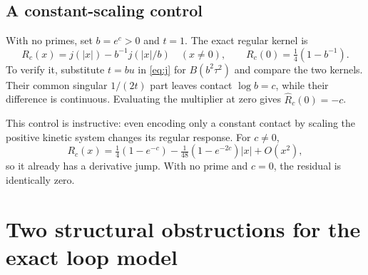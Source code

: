 \documentclass[11pt]{article}
\numberwithin{equation}{section}
\theoremstyle{definition}
\theoremstyle{remark}
\begin{document}
\subsection{A constant-scaling control}
With no primes, set $b=e^c>0$ and $t=1$. The exact regular kernel is
\begin{equation}
 R_c(x)=j(|x|)-b^{-1}j(|x|/b)\quad(x\ne0),
 \qquad R_c(0)=\tfrac14(1-b^{-1}).
 \label{eq:constantkernel}
\end{equation}
To verify it, substitute $t=bu$ in \eqref{eq:j} for $B(b^2\tau^2)$ and compare the two kernels. Their common singular $1/(2t)$ part leaves contact $\log b=c$, while their difference is continuous. Evaluating the multiplier at zero gives $\widehat R_c(0)=-c$.

This control is instructive: even encoding only a constant contact by scaling the positive kinetic system changes its regular response. For $c\ne0$,
\begin{equation}
 R_c(x)=\tfrac14(1-e^{-c})
 -\tfrac1{48}(1-e^{-2c})|x|+O(x^2),
\end{equation}
so it already has a derivative jump. With no prime and $c=0$, the residual is identically zero.

\section{Two structural obstructions for the exact loop model}
\label{sec:structural}
\end{document}
